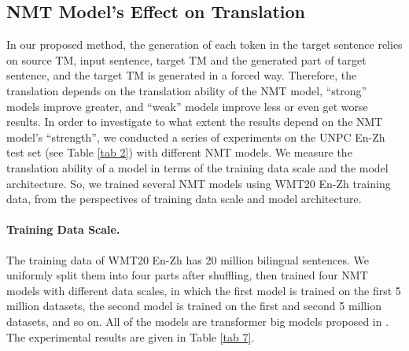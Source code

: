 \documentclass[letterpaper]{article} %
\begin{document}
\subsection{NMT Model's Effect on Translation}
In our proposed method, the generation of each token in the target sentence relies on source TM, input sentence, target TM and the generated part of target sentence, and the target TM is generated in a forced way. Therefore, the translation depends on the translation ability of the NMT model, ``strong'' models improve greater, and ``weak'' models improve less or even get worse results. In order to investigate to what extent the results depend on the NMT model's ``strength'', we conducted a series of experiments on the UNPC En-Zh test set (see Table \ref{tab 2}) with different NMT models. We measure the translation ability of a model in terms of the training data scale and the model architecture. So, we trained several NMT models using WMT20 En-Zh training data, from the perspectives of training data scale and model architecture.

\paragraph{Training Data Scale.}
The training data of WMT20 En-Zh has 20 million bilingual sentences. We uniformly split them into four parts after shuffling, then trained four NMT models with different data scales, in which the first model is trained on the first 5 million datasets, the second model is trained on the first and second 5 million datasets, and so on. All of the models are transformer big models proposed in \citet{NIPS2017_attention}. The experimental results are given in Table \ref{tab 7}.
\end{document}

